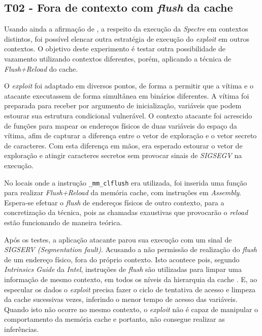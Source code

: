 \documentclass[
	article,			    %
	12pt,				    %
	oneside,			    %
	a4paper,			    %
	chapter=TITLE,		    %
	section=TITLE,		    %
	subsection=TITLE,	    %
	english,			    %
	brazil,				    %
	sumario=tradicional
]{abntex2}
\begin{document}
\subsection{T02 - Fora de contexto com \emph{flush} da cache}
Usando ainda a afirmação de , a respeito da execução da \emph{Spectre} em contextos distintos, foi possível elencar outra estratégia de execução do \emph{exploit} em outros contextos. O objetivo deste experimento é testar outra possibilidade de vazamento utilizando contextos diferentes, porém, aplicando a técnica de \emph{Flush+Reload} do cache.

O \emph{exploit} foi adaptado em diversos pontos, de forma a permitir que a vítima e o atacante executassem de forma simultânea em binários diferentes. A vítima foi preparada para receber por argumento de inicialização, variáveis que podem estourar sua estrutura condicional vulnerável. O contexto atacante foi acrescido de funções para mapear os endereços físicos de duas variáveis do espaço da vítima, afim de capturar a diferença entre o vetor de exploração e o vetor secreto de caracteres. Com esta diferença em mãos, era esperado estourar o vetor de exploração e atingir caracteres secretos sem provocar sinais de \emph{SIGSEGV} na execução.

No locais onde a instrução \lstinline[language=C, style=c]{_mm_clflush} era utilizada, foi inserida uma função para realizar \emph{Flush+Reload} da memória cache, com instruções em \emph{Assembly}. Espera-se efetuar o \emph{flush} de endereços físicos de outro contexto, para a concretização da técnica, pois as chamadas exaustivas que provocarão o \emph{reload} estão funcionando de maneira teórica.

Após os testes, a aplicação atacante parou sua execução com um sinal de \emph{SIGSERV (Segmentation fault)}. Acusando a não permissão de realização do \emph{flush} de um endereço físico, fora do próprio contexto. Isto acontece pois, segundo \emph{Intrinsics Guide} da \emph{Intel}, instruções de \emph{flush} são utilizadas para limpar uma informação de mesmo contexto, em todos os níveis da hierarquia da cache \cite{Intel2018Intrinsics}. E, ao especular os dados o \emph{exploit} precisa fazer o ciclo de tentativa de acesso e limpeza da cache sucessivas vezes, inferindo o menor tempo de acesso das variáveis. Quando isto não ocorre no mesmo contexto, o \emph{exploit} não é capaz de manipular o comportamento da memória cache e portanto, não consegue realizar as inferências.
\end{document}
